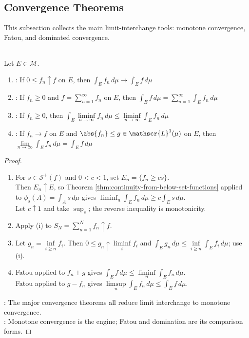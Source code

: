 \subsection{Convergence Theorems}

%

This subsection collects the main limit-interchange tools: monotone convergence, Fatou, and dominated convergence.

\begin{theorem} \label{thm:lebesgue-product-main-source-todo}\label{thm:lebesgue-convergence-theorems}\label{thm:dominated-convergence-lebesgue} \\
Let $E\in\mathcal{M}$.
\begin{enumerate}[label=(\roman*)]
\setlength{\itemsep}{0pt}
\item {}: If $0\leq f_n\uparrow f$ on $E$, then $\int_E f_n\,d\mu\to\int_E f\,d\mu$
\item {}: If $f_n\geq0$ and $f=\sum_{n=1}^{\infty}f_n$ on $E$, then $\int_E f\,d\mu=\sum_{n=1}^{\infty}\int_E f_n\,d\mu$
\item {}: If $f_n\geq0$, then $\int_E \liminf\limits_{n\to\infty}f_n\,d\mu\leq\liminf\limits_{n\to\infty}\int_E f_n\,d\mu$
\item {}: If $f_n\to f$ on $E$ and $\abs{f_n}\leq g\in\mathscr{L}^1(\mu)$ on $E$, then $\lim\limits_{n\to\infty}\int_E f_n\,d\mu=\int_E f\,d\mu$
\end{enumerate}
\begin{proof}
\begin{enumerate}[label=(\roman*)]
\setlength{\itemsep}{0pt}
\item For $s\in\mathcal{S}^+(f)$ and $0<c<1$, set $E_n=\{f_n\geq cs\}$.\\
Then $E_n\uparrow E$, so Theorem \ref{thm:continuity-from-below-set-functions} applied to $\phi_s(A)=\int_A s\,d\mu$ gives $\liminf_n\int_E f_n\,d\mu\geq c\int_Es\,d\mu$.\\
Let $c\uparrow1$ and take $\sup_s$; the reverse inequality is monotonicity.
\item Apply (i) to $S_N=\sum\limits_{n=1}^{N}f_n\uparrow f$.
\item Let $g_n=\inf\limits_{i\geq n}f_i$. Then $0\leq g_n\uparrow\liminf\limits_i f_i$ and $\int_Eg_n\,d\mu\leq\inf\limits_{i\geq n}\int_Ef_i\,d\mu$; use (i).
\item Fatou applied to $f_n+g$ gives $\int_E f\,d\mu\leq\liminf\limits_n\int_E f_n\,d\mu$.\\
Fatou applied to $g-f_n$ gives $\limsup\limits_n\int_E f_n\,d\mu\leq\int_E f\,d\mu$.
\end{enumerate}
: The major convergence theorems all reduce limit interchange to monotone convergence.\\
: Monotone convergence is the engine; Fatou and domination are its comparison forms.
\end{proof}
\end{theorem}

